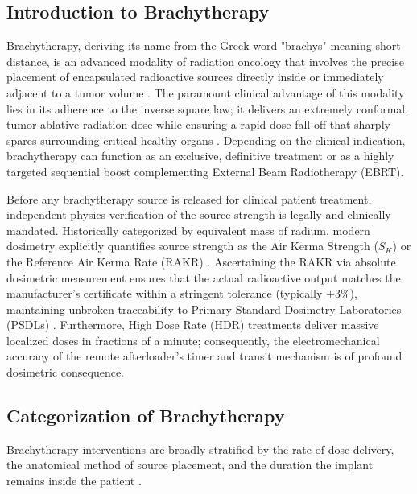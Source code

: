 \subsection{Introduction to Brachytherapy}
Brachytherapy, deriving its name from the Greek word "brachys" meaning short distance, is an advanced modality of radiation oncology that involves the precise placement of encapsulated radioactive sources directly inside or immediately adjacent to a tumor volume \cite{khan2014physics}. The paramount clinical advantage of this modality lies in its adherence to the inverse square law; it delivers an extremely conformal, tumor-ablative radiation dose while ensuring a rapid dose fall-off that sharply spares surrounding critical healthy organs \cite{podgorsak2005radiation}. Depending on the clinical indication, brachytherapy can function as an exclusive, definitive treatment or as a highly targeted sequential boost complementing External Beam Radiotherapy (EBRT).

Before any brachytherapy source is released for clinical patient treatment, independent physics verification of the source strength is legally and clinically mandated. Historically categorized by equivalent mass of radium, modern dosimetry explicitly quantifies source strength as the Air Kerma Strength ($S_K$) or the Reference Air Kerma Rate (RAKR) \cite{nath1995dosimetry}. Ascertaining the RAKR via absolute dosimetric measurement ensures that the actual radioactive output matches the manufacturer's certificate within a stringent tolerance (typically $\pm 3\%$), maintaining unbroken traceability to Primary Standard Dosimetry Laboratories (PSDLs) \cite{rivard2004update}. Furthermore, High Dose Rate (HDR) treatments deliver massive localized doses in fractions of a minute; consequently, the electromechanical accuracy of the remote afterloader's timer and transit mechanism is of profound dosimetric consequence.

\subsection{Categorization of Brachytherapy}
Brachytherapy interventions are broadly stratified by the rate of dose delivery, the anatomical method of source placement, and the duration the implant remains inside the patient \cite{khan2014physics}.

